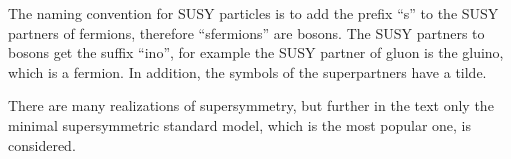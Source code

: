 The naming convention for SUSY particles is to add the prefix ``s'' to the SUSY partners of fermions, therefore ``sfermions'' are bosons. The SUSY partners to bosons get the suffix ``ino'', for example the SUSY partner of gluon is the gluino, which is a fermion. In addition, the symbols of the superpartners have a tilde.

There are many realizations of supersymmetry, but further in the text only the minimal supersymmetric standard model, which is the most popular one, is considered.




